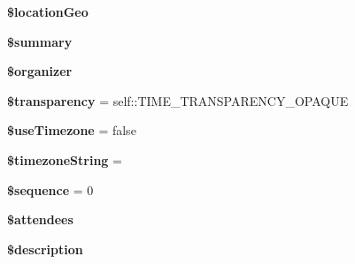 \begin{DoxyCompactItemize}
\item 
\mbox{\label{class_eluceo_1_1i_cal_1_1_component_1_1_event_ae3961ccb3ce89c7baca2585d2cafa765}} 
{\bfseries \$location\+Geo}
\item 
\mbox{\label{class_eluceo_1_1i_cal_1_1_component_1_1_event_a9f4d6b245cdf4f06e4fafe69847dda73}} 
{\bfseries \$summary}
\item 
\mbox{\label{class_eluceo_1_1i_cal_1_1_component_1_1_event_a2fc5a6078d59587a3c3f3c4d61e32a72}} 
{\bfseries \$organizer}
\item 
\mbox{\label{class_eluceo_1_1i_cal_1_1_component_1_1_event_acfd91bbd21f46c356629d46f03af2655}} 
{\bfseries \$transparency} = self\+::\+T\+I\+M\+E\+\_\+\+T\+R\+A\+N\+S\+P\+A\+R\+E\+N\+C\+Y\+\_\+\+O\+P\+A\+Q\+UE
\item 
\mbox{\label{class_eluceo_1_1i_cal_1_1_component_1_1_event_a1f2e21f53ee5b881b90173367aef38c5}} 
{\bfseries \$use\+Timezone} = false
\item 
\mbox{\label{class_eluceo_1_1i_cal_1_1_component_1_1_event_ae4169d205d495f05539575cbcf9f948b}} 
{\bfseries \$timezone\+String} = \textquotesingle{}\textquotesingle{}
\item 
\mbox{\label{class_eluceo_1_1i_cal_1_1_component_1_1_event_afa00f2bea46837811b5e2cc010f8e15a}} 
{\bfseries \$sequence} = 0
\item 
\mbox{\label{class_eluceo_1_1i_cal_1_1_component_1_1_event_ab893aa733c0a0e9d2de6c451ac0a7c5b}} 
{\bfseries \$attendees}
\item 
\mbox{\label{class_eluceo_1_1i_cal_1_1_component_1_1_event_aa87260cdd64e39b997af3eb49f4a71ad}} 
{\bfseries \$description}
\item 
\mbox{\label{class_eluceo_1_1i_cal_1_1_component_1_1_event_ad6ca80a1568a7b1d7b9427695df1b313}} 

\end{DoxyCompactItemize}
